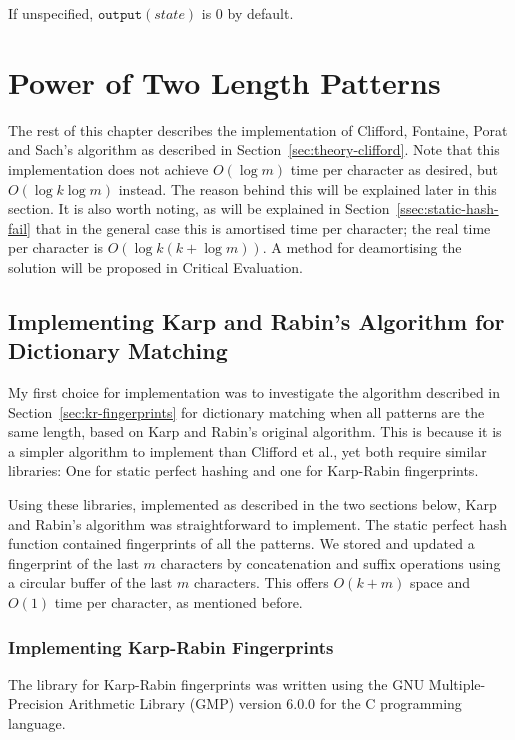 \documentclass[ %
                    author={Dominic Joseph Moylett},
                    degree={MEng},
                     title={Dictionary Matching with Fingerprints},
                  subtitle={An Empirical Analysis},
                      type={research},
                      year={2015} ]{dissertation}
\begin{document}
If unspecified, $\texttt{output}(state)$ is 0 by default.

\section{Power of Two Length Patterns}

The rest of this chapter describes the implementation of Clifford, Fontaine, Porat and Sach's\cite{2015arXiv150406242C} algorithm as described in Section~\ref{sec:theory-clifford}. Note that this implementation does not achieve $O(\log m)$ time per character as desired, but $O(\log k\log m)$ instead. The reason behind this will be explained later in this section. It is also worth noting, as will be explained in Section~\ref{ssec:static-hash-fail} that in the general case this is amortised time per character; the real time per character is $O(\log k(k + \log m))$. A method for deamortising the solution will be proposed in Critical Evaluation.

\subsection{Implementing Karp and Rabin's Algorithm for Dictionary Matching}

My first choice for implementation was to investigate the algorithm described in Section~\ref{sec:kr-fingerprints} for dictionary matching when all patterns are the same length, based on Karp and Rabin's original algorithm. This is because it is a simpler algorithm to implement than Clifford et al., yet both require similar libraries: One for static perfect hashing and one for Karp-Rabin fingerprints.

Using these libraries, implemented as described in the two sections below, Karp and Rabin's algorithm was straightforward to implement. The static perfect hash function contained fingerprints of all the patterns. We stored and updated a fingerprint of the last $m$ characters by concatenation and suffix operations using a circular buffer of the last $m$ characters. This offers $O(k + m)$ space and $O(1)$ time per character, as mentioned before.

\subsubsection{Implementing Karp-Rabin Fingerprints}
\label{sssec:kr-implementation}

The library for Karp-Rabin fingerprints was written using the GNU Multiple-Precision Arithmetic Library (GMP) version 6.0.0 for the C programming language.
\end{document}

